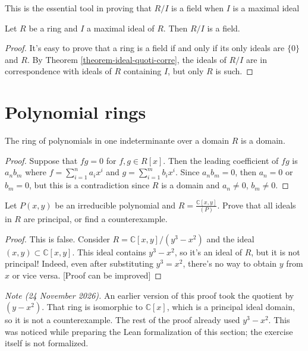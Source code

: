 \noindent
This is the essential tool in proving that
$R/I$ is a field
when $I$ is a maximal ideal

\begin{lemma}
\label{lemma-quoti-ring-maxim-ideal-field}
Let $R$ be a ring and $I$ a maximal ideal of
$R$.
Then $R/I$ is a field.
\end{lemma}

\begin{proof}
It's easy to prove that a ring is a field if
and only if its
only ideals are $\{0\}$ and $R$. By Theorem
\ref{theorem-ideal-quoti-corre},
the ideals of $R/I$ are in correspondence
with ideals of $R$ containing $I$,
but only $R$ is such.
\end{proof}

\section{Polynomial rings}
\label{section-polynomial-%
rings}

\begin{lemma}
\label{lemma-ring-polyn-one-%
indet-over}
The ring of polynomials in one indeterminante
over
a domain $R$ is a domain.
\end{lemma}

\begin{proof}
Suppose that $fg=0$ for $f,g \in R[x]$. Then
the leading coefficient of $fg$ is $a_nb_m$
where $f=\sum_{i=1}^n a_ix^i$ and
$g=\sum_{i=1}^mb_ix^i$.
Since $a_nb_m=0$, then $a_n=0$ or $b_m=0$,
but this is a contradiction since $R$ is a
domain and $a_n \neq 0$, $b_m \neq 0$.
\end{proof}


\begin{exercise}
\label{exercise-ring-of-plane-curve-is-pid}
Let $P(x,y)$ be an irreducible polynomial
and $R = \frac{\mathbb{C}[x,y]}{(P)}$.
Prove that all ideals in $R$ are
principal, or find a counterexample.
\end{exercise}

\begin{proof}
This is false. Consider
$R=\mathbb{C}[x,y]/(y^3-x^2)$
and the ideal $(x,y) \subset
\mathbb{C}[x,y]$.
This ideal contains $y^3-x^2$,
so it's an ideal of $R$,
but it is not principal!
Indeed, even after substituting $y^3=x^2$,
there's no way to obtain $y$ from $x$
or vice versa. [Proof can be improved]
\end{proof}

\medskip\noindent
{\it Note (24 November 2026).}
An earlier version of this proof
took the quotient by $(y-x^2)$.
That ring is isomorphic to
$\mathbb{C}[x]$, which is a principal
ideal domain, so it is not a counterexample.
The rest of the proof already used
$y^3-x^2$. This was noticed while preparing
the Lean formalization of this section;
the exercise itself is not formalized.

